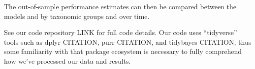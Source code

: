 \documentclass[12pt,letterpaper]{article}
\begin{document}
The out-of-sample performance estimates can then be compared between the models and by taxonomic groups and over time.


See our code repository LINK for full code details. Our code uses ``tidyverse'' tools such as dplyr CITATION, purr CITATION, and tidybayes CITATION, thus some familiarity with that package ecosystem is necessary to fully comprehend how we've processed our data and results.
\end{document}
